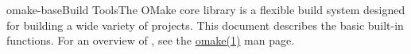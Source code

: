 %
%
%
\begin{Name}{1}{omake-base}{\authors}{Build Tools}{The OMake core library}
   is a flexible build system designed for building a wide variety of projects.
  This document describes the basic built-in functions.  For an overview of ,
  see the \href{omake.html}{omake(1)} man page.
\end{Name}

